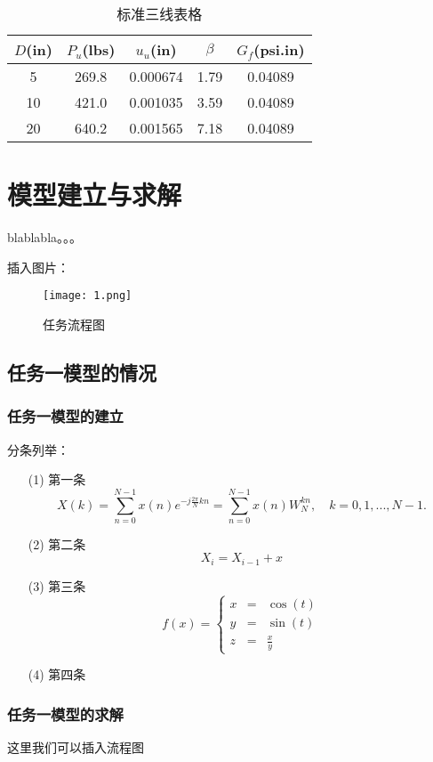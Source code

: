 \documentclass[withoutpreface,bwprint]{cumcmthesis} %
\begin{document}
\begin{table}[!htbp]
\caption{标准三线表格}\label{tab001} \centering
\begin{tabular}{ccccc}
\toprule[1.5pt]
$D$(in) & $P_u$(lbs) & $u_u$(in) & $\beta$ & $G_f$(psi.in)\\
\midrule[1pt]
 5 & 269.8 & 0.000674 & 1.79 & 0.04089\\
10 & 421.0 & 0.001035 & 3.59 & 0.04089\\
20 & 640.2 & 0.001565 & 7.18 & 0.04089\\
\bottomrule[1.5pt]
\end{tabular}
\end{table}

\section{模型建立与求解}

blablabla。。。

插入图片：
\begin{figure}[!h]
\centering
\texttt{[image: 1.png]}
\caption{任务流程图}
\end{figure}
\subsection{任务一模型的情况}
\subsubsection{任务一模型的建立}
分条列举：
\begin{itemize}
\item[(1)] 
第一条
\begin{equation}
X(k)=\sum_{n=0}^{N-1} x(n)e^{-j \frac{2 \pi}{N} k n}=\sum_{n=0}^{N-1} x(n) W_N^{kn},\quad k=0,1,...,N-1.
\end{equation}

\item[(2)]
第二条
\begin{equation}
X_i=X_{i-1}+x
\end{equation}
\item[(3)]
第三条
$$ f(x)=\left\{
\begin{aligned}
x & = & \cos(t) \\
y & = & \sin(t) \\
z & = & \frac xy
\end{aligned}
\right.
$$
\item[(4)]
第四条
\end{itemize}
\subsubsection{任务一模型的求解}
这里我们可以插入流程图
\end{document}
